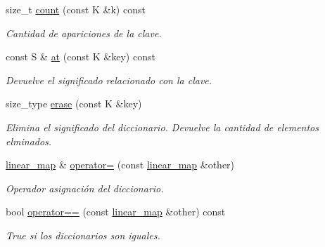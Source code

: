 \begin{DoxyCompactItemize}
size\+\_\+t \mbox{\hyperlink{classlinear__map_ac906ffa073c059c8ea5897b79c92c6f4}{count}} (const K \&k) const
\begin{DoxyCompactList}\small\item\em Cantidad de apariciones de la clave. \end{DoxyCompactList}\item 
const S \& \mbox{\hyperlink{classlinear__map_a373f306f920941123cb47f6b77ed97ed}{at}} (const K \&key) const
\begin{DoxyCompactList}\small\item\em Devuelve el significado relacionado con la clave. \end{DoxyCompactList}\item 
size\+\_\+type \mbox{\hyperlink{classlinear__map_a932198aa420701fb84af74434764be9d}{erase}} (const K \&key)
\begin{DoxyCompactList}\small\item\em Elimina el significado del diccionario. Devuelve la cantidad de elementos elminados. \end{DoxyCompactList}\item 
\mbox{\hyperlink{classlinear__map}{linear\+\_\+map}} \& \mbox{\hyperlink{classlinear__map_a9868e2ada8b775c57521506fe7dd24a7}{operator=}} (const \mbox{\hyperlink{classlinear__map}{linear\+\_\+map}} \&other)
\begin{DoxyCompactList}\small\item\em Operador asignación del diccionario. \end{DoxyCompactList}\item 
bool \mbox{\hyperlink{classlinear__map_a3429a0dcc296c4098aef699e089073a1}{operator==}} (const \mbox{\hyperlink{classlinear__map}{linear\+\_\+map}} \&other) const
\begin{DoxyCompactList}\small\item\em True si los diccionarios son iguales. \end{DoxyCompactList}\end{DoxyCompactItemize}
